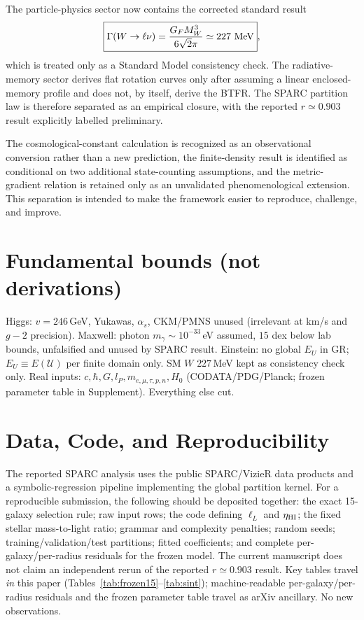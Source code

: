 \documentclass[twocolumn]{aastex631}
\begin{document}
The particle-physics sector now contains the corrected standard result
\[
\boxed{\Gamma(W\to\ell\nu)=\frac{G_FM_W^3}{6\sqrt2\pi}\simeq227\ {\rm MeV}},
\]
which is treated only as a Standard Model consistency check. The radiative-memory sector derives flat rotation curves only after assuming a linear enclosed-memory profile and does not, by itself, derive the BTFR. The SPARC partition law is therefore separated as an empirical closure, with the reported $r\simeq0.903$ result explicitly labelled preliminary.

The cosmological-constant calculation is recognized as an observational conversion rather than a new prediction, the finite-density result is identified as conditional on two additional state-counting assumptions, and the metric-gradient relation is retained only as an unvalidated phenomenological extension. This separation is intended to make the framework easier to reproduce, challenge, and improve.

\section*{Fundamental bounds (not derivations)}
Higgs: $v=246$\,GeV, Yukawas, $\alpha_{s}$, CKM/PMNS unused (irrelevant at km/s and $g-2$ precision). Maxwell: photon $m_{\gamma}\sim10^{-33}$\,eV assumed, $15$ dex below lab bounds, unfalsified and unused by SPARC result. Einstein: no global $E_{U}$ in GR; $E_{U}\equiv E(\mathcal U)$ per finite domain only. SM $W$ $227$\,MeV kept as consistency check only. Real inputs: $c,\hbar,G,l_{P},m_{e,\mu,\tau,p,n},H_{0}$ (CODATA/PDG/Planck; frozen parameter table in Supplement). Everything else cut.

\section*{Data, Code, and Reproducibility}
The reported SPARC analysis uses the public SPARC/VizieR data products and a symbolic-regression pipeline implementing the global partition kernel. For a reproducible submission, the following should be deposited together: the exact 15-galaxy selection rule; raw input rows; the code defining $\ell_L$ and $\eta_{\rm HI}$; the fixed stellar mass-to-light ratio; grammar and complexity penalties; random seeds; training/validation/test partitions; fitted coefficients; and complete per-galaxy/per-radius residuals for the frozen model. The current manuscript does not claim an independent rerun of the reported $r\simeq0.903$ result. Key tables travel \emph{in} this paper (Tables~\ref{tab:frozen15}--\ref{tab:sint}); machine-readable per-galaxy/per-radius residuals and the frozen parameter table travel as arXiv ancillary. No new observations.
\end{document}
